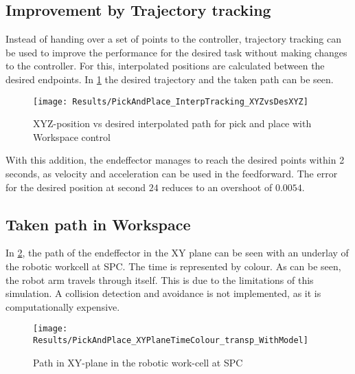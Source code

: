 \subsection{Improvement by Trajectory tracking}
Instead of handing over a set of points to the controller, trajectory tracking can be used to improve the performance for the desired task without making changes to the controller.
For this, interpolated positions are calculated between the desired endpoints.
In \cref{fig:PickAndPlace_InterpTracking_XYZvsDesXYZ} the desired trajectory and the taken path can be seen.
\begin{figure}[H]
	\texttt{[image: Results/PickAndPlace\_InterpTracking\_XYZvsDesXYZ]}
	\caption{XYZ-position vs desired interpolated path for pick and place with Workspace control}
	\label{fig:PickAndPlace_InterpTracking_XYZvsDesXYZ}
\end{figure}
With this addition, the endeffector manages to reach the desired points within 2 seconds, as velocity and acceleration can be used in the feedforward. The error for the desired position at second $24$ reduces to an overshoot of $0.0054$.

\subsection{Taken path in Workspace}
In \cref{fig:PickAndPlace_XYPlane_WithModel}, the path of the endeffector in the XY plane can be seen with an underlay of the robotic workcell at SPC. The time is represented by colour.
As can be seen, the robot arm travels through itself. This is due to the limitations of this simulation. A collision detection and avoidance is not implemented, as it is computationally expensive. 

\begin{figure}[H]
	\texttt{[image: Results/PickAndPlace\_XYPlaneTimeColour\_transp\_WithModel]}
	\caption{Path in XY-plane in the robotic work-cell at SPC}
	\label{fig:PickAndPlace_XYPlane_WithModel}
\end{figure}